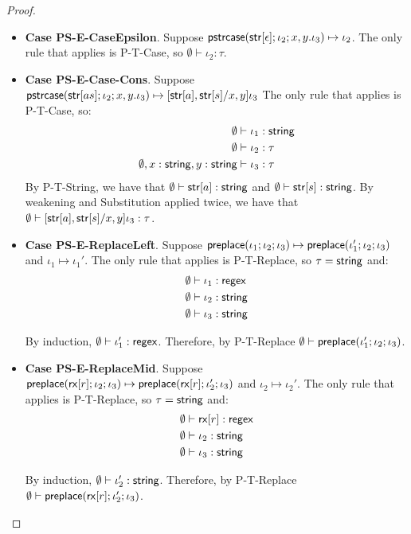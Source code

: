 \documentclass[11pt,leqno]{article}
\theoremstyle{definition}
\renewcommand{\tstr}[1]{{{\sf str}[#1]}}
\newcommand{\preplace}[3]{{\sf preplace}(#1;#2;#3)}
\newcommand{\rx}[1]{ {\sf rx}[#1] }
\newcommand{\str}{{\sf string}}
\newcommand{\regex}{{\sf regex}}
\newcommand{\pstrcase}[3]{ {\sf pstrcase}(#1; #2; #3)}
\begin{document}
\begin{proof}
\begin{itemize}[label=$ $,itemsep=1ex]
\item \textbf{Case PS-E-CaseEpsilon}. 
Suppose $\pstrcase{\tstr{\epsilon}}{\iota_2}{x,y.\iota_3} \mapsto \iota_2$.
The only rule that applies is P-T-Case, so $\emptyset \vdash \iota_2 : \tau$.

\item \textbf{Case PS-E-Case-Cons}.
Suppose $\pstrcase{\tstr{as}}{\iota_2}{x,y.\iota_3} \mapsto [\tstr{a}, \tstr{s} / x,y] \iota_3$
The only rule that applies is P-T-Case, so:
\begin{align*}
  \emptyset &\vdash \iota_1 : \str \\
  \emptyset &\vdash \iota_2 : \tau \\
  \emptyset, x : \str, y : \str &\vdash \iota_3 : \tau
\end{align*}
By P-T-String, we have that $\emptyset \vdash \tstr{a} : \str$ and $\emptyset \vdash \tstr{s} : \str$. By weakening and Substitution applied twice, we have that $\emptyset \vdash [\tstr{a}, \tstr{s} / x,y] \iota_3 : \tau$.

\item \textbf{Case PS-E-ReplaceLeft}. 
Suppose $\preplace{\iota_1}{\iota_2}{\iota_3} \mapsto \preplace{\iota_1'}{\iota_2}{\iota_3}$
and $\iota_1 \mapsto \iota_1'$.
The only rule that applies is P-T-Replace, so $\tau=\str$ and:
\begin{align*}
  \emptyset &\vdash \iota_1 : \regex \\
  \emptyset &\vdash \iota_2 : \str \\
  \emptyset &\vdash \iota_3 : \str
\end{align*}

By induction, $\emptyset \vdash \iota_1' : \regex$.
Therefore, by P-T-Replace $\emptyset \vdash \preplace{\iota_1'}{\iota_2}{\iota_3}$.

\item \textbf{Case PS-E-ReplaceMid}. 
Suppose $\preplace{\rx{r}}{\iota_2}{\iota_3} \mapsto \preplace{\rx{r}}{\iota_2'}{\iota_3}$
and $\iota_2 \mapsto \iota_2'$.
The only rule that applies is P-T-Replace, so $\tau=\str$ and:
\begin{align*}
  \emptyset &\vdash \rx{r} : \regex \\
  \emptyset &\vdash \iota_2 : \str \\
  \emptyset &\vdash \iota_3 : \str
\end{align*}

By induction, $\emptyset \vdash \iota_2' : \str$.
Therefore, by P-T-Replace $\emptyset \vdash \preplace{\rx{r}}{\iota_2'}{\iota_3}$.


\end{itemize}
\end{proof}
\end{document}
